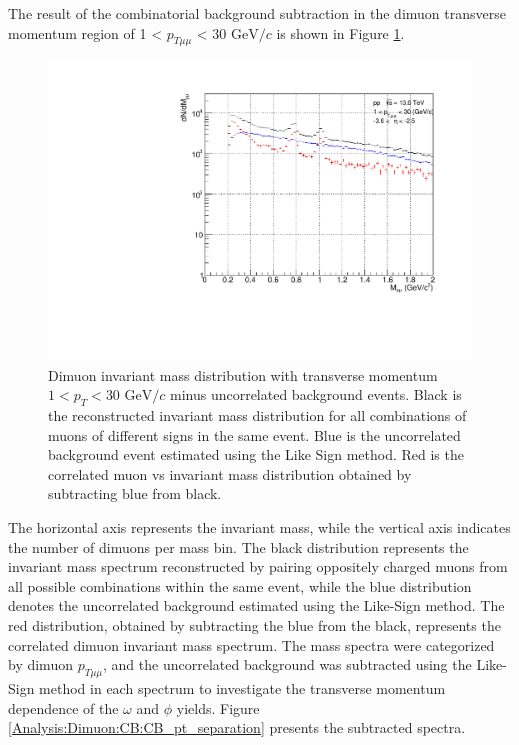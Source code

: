                 The result of the combinatorial background subtraction in the dimuon transverse momentum region of 1 < $p_{T\mu\mu}$ < 30 $\mathrm{GeV}/c$ is shown in Figure \ref{All_pt_CB}.
                \begin{figure}[H]
                    \centering
                    \includegraphics[keepaspectratio, scale=0.5]{fig/3_4_1_CB_pt_1to30.pdf}
                    \caption{Dimuon invariant mass distribution with transverse momentum $1< p_T <30$ $\mathrm{GeV}/c$ minus uncorrelated background events. Black is the reconstructed invariant mass distribution for all combinations of muons of different signs in the same event. Blue is the uncorrelated background event estimated using the Like Sign method. Red is the correlated muon vs invariant mass distribution obtained by subtracting blue from black.}
                    \label{All_pt_CB}
                \end{figure}
                The horizontal axis represents the invariant mass, while the vertical axis indicates the number of dimuons per mass bin. The black distribution represents the invariant mass spectrum reconstructed by pairing oppositely charged muons from all possible combinations within the same event, while the blue distribution denotes the uncorrelated background estimated using the Like-Sign method. The red distribution, obtained by subtracting the blue from the black, represents the correlated dimuon invariant mass spectrum. The mass spectra were categorized by dimuon \( p_{T\mu\mu} \), and the uncorrelated background was subtracted using the Like-Sign method in each spectrum to investigate the transverse momentum dependence of the \( \omega \) and \( \phi \) yields. Figure \ref{Analysis:Dimuon:CB:CB_pt_separation} presents the subtracted spectra.
